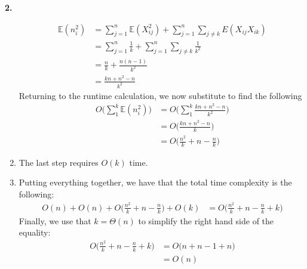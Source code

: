 \documentclass[12pt]{amsart}
\newenvironment{statement}[1]{\smallskip\noindent\color[rgb]{0.0,0.0,0.0} {\bf #1.}}{}
\theoremstyle{definition}
\theoremstyle{remark}
\newcommand{\E}{\mathbb{E}}
\newcommand{\1}{\mathds{1}}
\begin{document}
\begin{statement}{2}
\begin{enumerate}
    \begin{align*}
        \E(n_i^2) &= \sum_{j=1}^n\E(X_{ij}^2) + \sum_{j=1}^n\sum_{j\neq k}E(X_{ij}X_{ik})\\ 
        &= \sum_{j=1}^n\frac{1}{k}  + \sum_{j=1}^n\sum_{j\neq k}\frac{1}{k^2}\\ 
        &= \frac{n}{k} + \frac{n(n-1)}{k^2}\\ 
        &= \frac{kn + n^2 - n}{k^2}
    \end{align*}
    Returning to the runtime calculation, we now substitute to find the following
    \begin{align*}
        O\Big(\sum_{1}^k \E(n_i^2)\Big) &= O\Big(\sum_1^k \frac{kn + n^2 - n}{k^2}\Big)\\ 
        &= O\Big(\frac{kn + n^2 - n}{k}\Big)\\ 
        &= O\Big( \frac{n^2}{k} + n - \frac{n}{k} \Big)
    \end{align*}
    \item The last step requires $O(k)$ time. 
    \item Putting everything together, we have that the total time complexity is the following:
    \begin{align*}
        O(n) + O(n) + O\Big( \frac{n^2}{k} + n - \frac{n}{k} \Big) + O(k) &= O\Big( \frac{n^2}{k} + n - \frac{n}{k} + k \Big)
    \end{align*}
    Finally, we use that $k = \Theta(n)$ to simplify the right hand side of the equality:
    \begin{align*}
        O\Big( \frac{n^2}{k} + n - \frac{n}{k} + k \Big) &= O\Big( n + n - 1 + n \Big)\\ 
        &= O(n)
    \end{align*}

\end{enumerate}
\end{statement}
\end{document}
